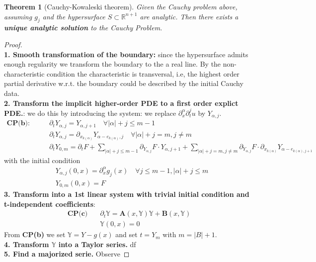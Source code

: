 \documentclass[a4paper,11pt,oneside,fleqn]{book}
\newtheorem{theorem}{Theorem}[section]
\theoremstyle{definition}
\theoremstyle{remark}
\begin{document}
\begin{theorem}[Cauchy-Kowaleski theorem]
	Given the Cauchy problem above, assuming $g_j$ and the hypersurface $S \subset \mathbb{R}^{n + 1}$ are analytic. Then there exists a \textbf{unique analytic solution} to the Cauchy Problem.
\end{theorem}
\begin{proof}\quad\\
\textbf{1. Smooth transformation of the boundary:} since the hypersurface admits enough regularity we transform the boundary to the a real line. By the non-characteristic condition the characteristic is transversal, i.e,  the highest order partial derivative w.r.t. the boundary could be described by the initial Cauchy data. \\
\textbf{2. Transform the implicit higher-order PDE to a first order explict PDE.}: we do this by introducing the system: we replace $\partial_x^\alpha \partial_t^j u$ by $Y_{\alpha, j}$. 
\begin{align*} \textbf{CP(b):} \qquad
 	&\partial_t Y_{\alpha, j} = Y_{\alpha, j+1} \quad \forall |\alpha| + j \leq m - 1 \\
 	&\partial_t Y_{\alpha, j} = \partial_{x_{k(\alpha)}} Y_{\alpha - e_{k(\alpha)}, j} \quad \forall  |\alpha| + j = m, j \neq m \\
 	& \partial_t Y_{0, m} = \partial_t F + \sum_{|\alpha| + j \le m -1 }  \partial_{Y_{\alpha, j}} F \cdot  Y_{\alpha, j + 1} + \sum_{|\alpha| + j = m, j \neq m} \partial_{Y_{\alpha, j}} F \cdot  \partial_{x_{k(\alpha)}} Y_{ \alpha - e_{k(\alpha), j + 1}}
\end{align*}
with the initial condition
\begin{align*}
	 &Y_{\alpha, j}(0, x) = \partial^\alpha_x g_j(x) \quad \forall j \le m - 1, |\alpha|  + j \le m \\
	 &Y_{0, m}(0, x) = F \quad 
\end{align*}
\textbf{3. Transform into a 1st linear system with trivial initial condition and t-independent coefficients}:
\begin{align*}
\textbf{CP(c)} \quad
	&\partial_t \mathbb{Y} = \pmb{A}(x, \mathbb{Y}) \mathbb{Y} + \pmb{B}(x, \mathbb{Y}) \\
	&\mathbb{Y}(0, x) = 0
\end{align*}
From \textbf{CP(b)} we set $\mathbb{Y} = Y - g(x)$ and set $t = Y_m$ with $m = |B| + 1$. \\
\textbf{4. Transform $\mathbb{Y}$ into a Taylor series.}
df
\\
\textbf{5. Find a majorized serie.} Observe
\end{proof}
\end{document}
